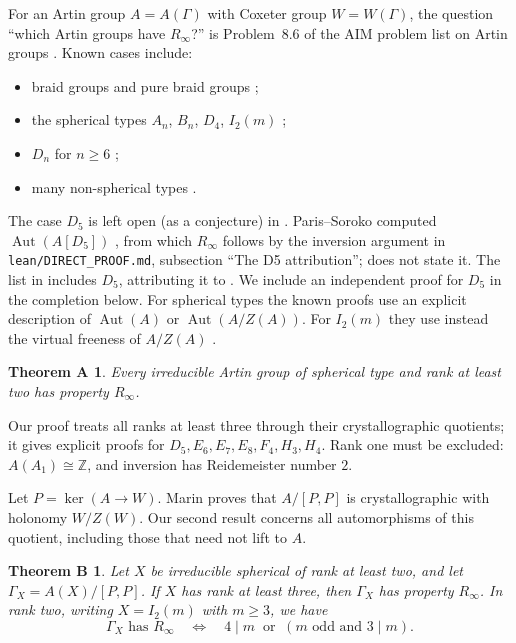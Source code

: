 \documentclass[11pt]{amsart}
\newtheorem*{mainthm}{Theorem A}
\newtheorem*{quotientthm}{Theorem B}
\theoremstyle{definition}
\newcommand{\Z}{\mathbb{Z}}
\newcommand{\Aut}{\operatorname{Aut}}
\newcommand{\Rinf}{R_\infty}
\begin{document}
For an Artin group $A=A(\Gamma)$ with Coxeter group $W=W(\Gamma)$, the question ``which Artin groups have $\Rinf$?''
is Problem~8.6 of the AIM problem list on Artin groups \cite{AIMPL}. Known cases include:
\begin{itemize}
\item braid groups \cite{FG10} and pure braid groups \cite{DGO21};
\item the spherical types $A_n$, $B_n$, $D_4$, $I_2(m)$ \cite{CS22};
\item $D_n$ for $n\ge6$ \cite[Thm.~1]{SV24};
\item many non-spherical types \cite{Juh11,SV24,Sor26}.
\end{itemize}
The case $D_5$ is left open (as a conjecture) in \cite[\S1]{SV24}. Paris--Soroko computed $\Aut(A[D_5])$
\cite[Thm.~1]{PS26}, from which $\Rinf$ follows by the inversion argument in \texttt{lean/DIRECT\_PROOF.md},
subsection ``The D5 attribution''; \cite{PS26} does not state
it. The list in \cite[\S1]{Sor26} includes $D_5$, attributing it to \cite{SV24}. We include an independent
proof for $D_5$ in the completion below.
For spherical types the known proofs use an explicit description of $\Aut(A)$ or $\Aut(A/Z(A))$. For $I_2(m)$
they use instead the virtual freeness of $A/Z(A)$ \cite{CS22}.

\begin{mainthm}
Every irreducible Artin group of spherical type and rank at least two has property $\Rinf$.
\end{mainthm}

Our proof treats all ranks at least three through their crystallographic quotients; it gives explicit
proofs for $D_5,E_6,E_7,E_8,F_4,H_3,H_4$.
Rank one must be excluded: $A(A_1)\cong\Z$, and inversion has Reidemeister number $2$.

Let $P=\ker(A\to W)$. Marin \cite[Thm.~2.1]{Mar15} proves that $A/[P,P]$ is crystallographic with holonomy
$W/Z(W)$. Our second result concerns all automorphisms of this quotient, including those that need not lift to $A$.

\begin{quotientthm}
Let $X$ be irreducible spherical of rank at least two, and let $\Gamma_X=A(X)/[P,P]$.
If $X$ has rank at least three, then $\Gamma_X$ has property $\Rinf$.
In rank two, writing $X=I_2(m)$ with $m\ge3$, we have
\[
 \Gamma_X\text{ has }\Rinf
 \quad\Longleftrightarrow\quad
 4\mid m\ \text{ or }\ (m\text{ odd and }3\mid m).
\]
\end{quotientthm}
\end{document}
